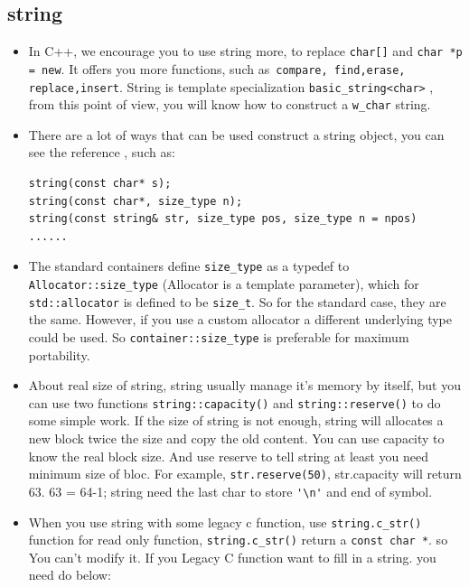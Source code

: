 \documentclass[a4paper,11pt,twoside]{book}
\begin{document}
\subsection{string}
\begin{itemize}
	\item In C++, we encourage you to use string more, to replace \texttt{char[]} and \texttt{char *p = new}.  It offers you more functions, such as\texttt{ compare, find,erase, replace,insert}. String is template specialization \texttt{basic\_string<char>} , from this point of view, you will know how to construct a \texttt{w\_char} string.
	
	
	\item There are a lot of ways that can be used construct a string object, you can see the reference , such as:
\begin{lstlisting}[numbers=none]
string(const char* s);
string(const char*, size_type n);
string(const string& str, size_type pos, size_type n = npos)
......
\end{lstlisting}
	
	\item The standard containers define \texttt{size\_type} as a typedef to \texttt{Allocator::size\_type} (Allocator is a template parameter), which for \texttt{std::allocator} is defined to be \texttt{size\_t}. So for the standard case, they are the same. However, if you use a custom allocator a different underlying type could be used. So \texttt{container::size\_type} is preferable for maximum portability.
		
	\item About real size of string, string usually manage it's memory by itself, but you can use two functions \texttt{string::capacity()} and \texttt{string::reserve()} to do some simple work. If the size of string is not enough, string will allocates a new block twice the size and copy the old content. You can use capacity to know the real block size. And use reserve to tell string at least you need minimum size of bloc. For example, \texttt{str.reserve(50)},  str.capacity will return 63. 63 = 64-1; string need the last char to store \verb='\n'= and end of symbol.
	
	\item When you use string with some legacy c function, use \texttt{string.c\_str()} function for read only function, \texttt{string.c\_str()} return a \texttt{const char *}. so You can't modify it. If you Legacy C function want to fill in a string. you need do below:
	

\end{itemize}
\end{document}

